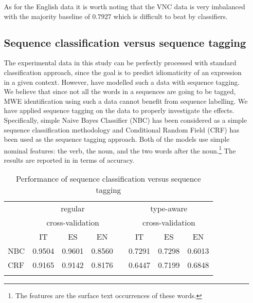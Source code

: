 \documentclass[output=paper
,modfonts
,nonflat]{langsci/langscibook}
\begin{document}
As for the English data it is worth noting that the VNC data is very imbalanced with the majority baseline of $0.7927$ which is difficult to beat by classifiers. 



\subsection{Sequence classification versus sequence tagging}
\label{sec:res2}
The experimental data in this study can be perfectly processed with standard classification approach, since the goal is to predict idiomaticity of an expression in a given context. However, \cite{scholivet-ramisch:2017:MWE2017} have modelled such a data with sequence tagging. We believe that since not all the words in a sequences are going to be tagged, MWE identification using such a data cannot benefit from sequence labelling. 
We have applied sequence tagging on the data to properly investigate the effects. Specifically, simple Naive Bayes Classifier (NBC) has been considered as a simple sequence classification methodology and Conditional Random Field (CRF) has been used as the sequence tagging approach. Both of the models use simple nominal features: the verb, the noun, and the two words after the noun.\footnote{The features are the surface text occurrences of these words.} The results are reported in  in terms of accuracy.

\begin{table}[!ht]
\small
\caption{Performance of sequence classification versus sequence tagging}
\label{tab:seqLabel}
 \begin{tabular}{lccccccc} 
  \lsptoprule

   & \multicolumn{3}{c}{regular}  & & \multicolumn{3}{c}{type-aware %
   } \\
   & \multicolumn{3}{c}{cross-validation} & & \multicolumn{3}{c}{cross-validation} \\
   \midrule
   & IT & ES & EN & & IT & ES & EN \\
 NBC  &  0.9504 & 0.9601 & 0.8560 & & 0.7291 & 0.7298 & 0.6013 \\
 \hline
 CRF  &  0.9165 & 0.9142 & 0.8176 & & 0.6447 & 0.7199 & 0.6848 \\
  \lspbottomrule
 \end{tabular}
\end{table}
\end{document}
